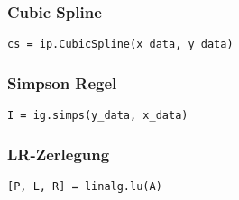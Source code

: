 \subsubsection{Cubic Spline}

\begin{verbatim}
cs = ip.CubicSpline(x_data, y_data)
\end{verbatim}

\subsubsection{Simpson Regel}

\begin{verbatim}
I = ig.simps(y_data, x_data)
\end{verbatim}

\subsubsection{LR-Zerlegung}

\begin{verbatim}
[P, L, R] = linalg.lu(A)
\end{verbatim}